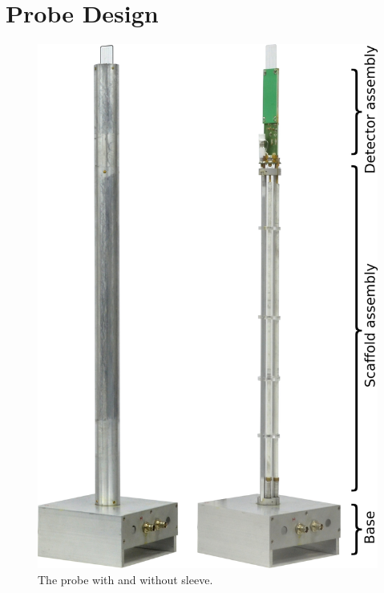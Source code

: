 \documentclass[preprint,12pt]{article}
\begin{document}
\section{Probe Design}
\label{sec:probe-design}
\begin{figure}
\centering
\includegraphics[width=.5\linewidth,keepaspectratio=true]{./figures/ms5n17-tlp-im-181218-probe.png} 
\caption{The probe with and without sleeve.}
\label{fig:probe} 
\end{figure}
\end{document}
